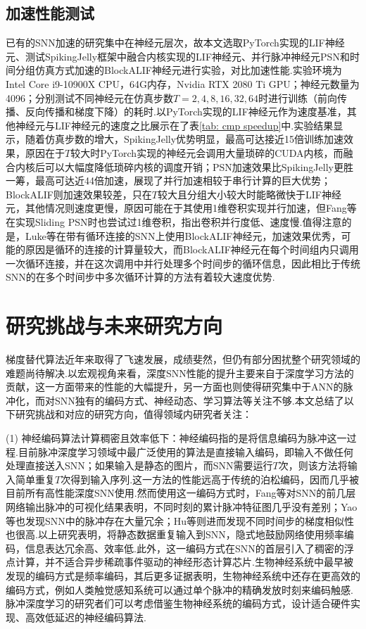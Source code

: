\documentclass{SCIS2020cn}
\begin{document}
\subsection{加速性能测试}
已有的SNN加速的研究集中在神经元层次，故本文选取PyTorch实现的LIF神经元、测试SpikingJelly框架中融合内核实现的LIF神经元\cite{doi:10.1126/sciadv.adi1480}、并行脉冲神经元PSN\cite{fang2023parallel}和时间分组仿真方式加速的BlockALIF神经元\cite{NEURIPS2023_b9f253c2}进行实验，对比加速性能.实验环境为Intel Core i9-10900X CPU，64G内存，Nvidia RTX 2080 Ti GPU；神经元数量为4096；分别测试不同神经元在仿真步数$T=2,4,8,16,32,64$时进行训练（前向传播、反向传播和梯度下降）的耗时.以PyTorch实现的LIF神经元作为速度基准，其他神经元与LIF神经元的速度之比展示在了表\ref{tab: cmp speedup}中.实验结果显示，随着仿真步数的增大，SpikingJelly优势明显，最高可达接近15倍训练加速效果，原因在于$T$较大时PyTorch实现的神经元会调用大量琐碎的CUDA内核，而融合内核后可以大幅度降低琐碎内核的调度开销；PSN加速效果比SpikingJelly更胜一筹，最高可达近44倍加速，展现了并行加速相较于串行计算的巨大优势；BlockALIF则加速效果较差，只在$T$较大且分组大小较大时能略微快于LIF神经元，其他情况则速度更慢，原因可能在于其使用1维卷积实现并行加速，但Fang等\cite{fang2023parallel}在实现Sliding PSN时也尝试过1维卷积，指出卷积并行度低、速度慢.值得注意的是，Luke等\cite{NEURIPS2023_b9f253c2}在带有循环连接的SNN上使用BlockALIF神经元，加速效果优秀，可能的原因是循环的连接的计算量较大，而BlockALIF神经元在每个时间组内只调用一次循环连接，并在这次调用中并行处理多个时间步的循环信息，因此相比于传统SNN的在多个时间步中多次循环计算的方法有着较大速度优势.

\section{研究挑战与未来研究方向}
梯度替代算法近年来取得了飞速发展，成绩斐然，但仍有部分困扰整个研究领域的难题尚待解决.以宏观视角来看，深度SNN性能的提升主要来自于深度学习方法的贡献，这一方面带来的性能的大幅提升，另一方面也则使得研究集中于ANN的脉冲化，而对SNN独有的编码方式、神经动态、学习算法等关注不够.本文总结了以下研究挑战和对应的研究方向，值得领域内研究者关注：

(1) 神经编码算法计算稠密且效率低下：神经编码指的是将信息编码为脉冲这一过程.目前脉冲深度学习领域中最广泛使用的算法是直接输入编码\cite{rathi2021diet}，即输入不做任何处理直接送入SNN；如果输入是静态的图片，而SNN需要运行$T$次，则该方法将输入简单重复$T$次得到输入序列.这一方法的性能远高于传统的泊松编码，因而几乎被目前所有高性能深度SNN\cite{SEWResNet, zhou2023spikformer, NEURIPS2023_ca0f5358}使用.然而使用这一编码方式时，Fang等\cite{fang2021incorporating}对SNN的前几层网络输出脉冲的可视化结果表明，不同时刻的累计脉冲特征图几乎没有差别；Yao等\cite{Yao_2023_ICCV}也发现SNN中的脉冲存在大量冗余；Hu等\cite{hu2024highperformance}则进而发现不同时间步的梯度相似性也很高.以上研究表明，将静态数据重复输入到SNN，隐式地鼓励网络使用频率编码，信息表达冗余高、效率低.此外，这一编码方式在SNN的首层引入了稠密的浮点计算，并不适合异步稀疏事件驱动的神经形态计算芯片.生物神经系统中最早被发现的编码方式是频率编码\cite{adrian1926impulses}，其后更多证据表明，生物神经系统中还存在更高效的编码方式，例如人类触觉感知系统可以通过单个脉冲的精确发放时刻来编码触感\cite{johansson2004first}.脉冲深度学习的研究者们可以考虑借鉴生物神经系统的编码方式，设计适合硬件实现、高效低延迟的神经编码算法.
\end{document}
